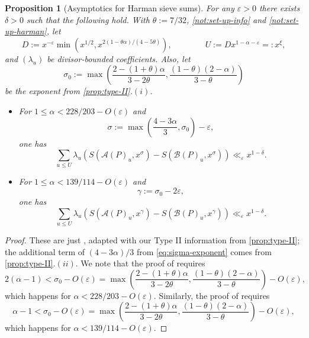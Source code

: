 \documentclass[reqno,11pt]{amsart}
\newtheorem{proposition}[theorem]{Proposition}
\theoremstyle{remark}
\numberwithin{equation}{section}
\newcommand{\mA}{\mathcal{A}}
\newcommand{\mB}{\mathcal{B}}
\newcommand{\eps}{\varepsilon}
\begin{document}
\begin{proposition}[Asymptotics for Harman sieve sums]
\label{prop:asymptotics-harman}
For any $\eps > 0$ there exists $\delta > 0$ such that the following hold.
With $\theta := 7/32$, \cref{not:set-up-info} and \cref{not:set-up-harman},
let 
\[
    D := x^{-\eps} \min\left(x^{1/2}, x^{2(1-\theta \alpha)/(4-5\theta)}\right),
    \qquad\qquad 
    U := Dx^{1-\alpha-\eps} =: x^\xi,
\] 
and $(\lambda_u)$ be divisor-bounded coefficients. Also, let
\begin{equation} \label{eq:sigma-0}
    \sigma_0 := \max \left(\frac{2-(1+\theta)\alpha}{3-2\theta}, \frac{(1-\theta)(2-\alpha)}{3-\theta}\right)
\end{equation}
be the exponent from \cref{prop:type-II}.$(i)$.
\begin{itemize}
    \item[$(i)$.] For $1 \le \alpha < 228/203 - O(\eps)$ and 
    \begin{equation} \label{eq:sigma-exponent}
        \sigma := \max \left(\frac{4-3\alpha}{3}, \sigma_0 \right) - \eps,
    \end{equation}
    one has
    \[
        \sum_{u \le U} \lambda_u \left( S\left(\mA(P)_u, x^\sigma\right) -
        S\left(\mB(P)_u, x^\sigma\right)\right)
        \ll_\eps x^{1-\delta}.
    \]
    \item[$(ii)$.] For $1 \le \alpha < 139/114 -O(\eps)$ and
    \begin{equation} \label{eq:gamma-exponent}
        \gamma := \sigma_0 - 2\eps,
    \end{equation}
    one has
    \[
        \sum_{u \le U} \lambda_u \left( S\left(\mA(P)_u, x^\gamma\right) -
        S\left(\mB(P)_u, x^\gamma\right)\right)
        \ll_\eps x^{1-\delta}.
    \]
\end{itemize}

\end{proposition}
\begin{proof}
These are just \cite[Propositions 3 and 4]{merikoski2023largest}, adapted with our Type II information from \cref{prop:type-II}; the additional term of $(4-3\alpha)/3$ from \cref{eq:sigma-exponent} comes from \cref{prop:type-II}.$(ii)$. We note that the proof of \cite[Proposition 3]{merikoski2023largest} requires
\[
    2(\alpha - 1) < \sigma_0 - O(\eps) = \max \left(\frac{2-(1+\theta)\alpha}{3-2\theta}, \frac{(1-\theta)(2-\alpha)}{3-\theta}\right) - O(\eps),
\]
which happens for $\alpha < 228/203 - O(\eps)$. Similarly, the proof of \cite[Proposition 4]{merikoski2023largest} requires
\[
    \alpha - 1 < \sigma_0 - O(\eps) = \max \left(\frac{2-(1+\theta)\alpha}{3-2\theta}, \frac{(1-\theta)(2-\alpha)}{3-\theta}\right) - O(\eps),
\]
which happens for $\alpha < 139/114 - O(\eps)$.
\end{proof}
\end{document}
